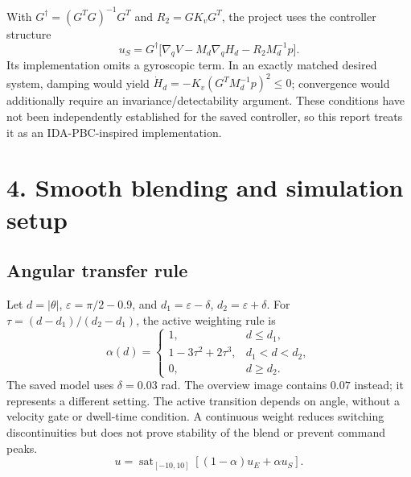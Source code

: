 \documentclass[11pt,a4paper]{article}
\newcommand{\reportsection}[1]{\section*{\color{navy}#1}}
\newcommand{\topic}[1]{\subsection*{\color{teal}#1}}
\begin{document}
With $G^\dagger=(G^TG)^{-1}G^T$ and $R_2=GK_vG^T$, the project uses the controller structure
\begin{equation}
 u_S=G^\dagger\big[\nabla_q V-M_d\nabla_q H_d-R_2M_d^{-1}p\big].
\end{equation}
Its implementation omits a gyroscopic term. In an exactly matched desired system, damping would yield $\dot H_d=-K_v(G^TM_d^{-1}p)^2\leq0$; convergence would additionally require an invariance/detectability argument. These conditions have not been independently established for the saved controller, so this report treats it as an IDA-PBC-inspired implementation.

\clearpage
\reportsection{4. Smooth blending and simulation setup}
\topic{Angular transfer rule}
Let $d=\lvert\theta\rvert$, $\varepsilon=\pi/2-0.9$, and $d_1=\varepsilon-\delta$, $d_2=\varepsilon+\delta$. For $\tau=(d-d_1)/(d_2-d_1)$, the active weighting rule is
\begin{equation}
 \alpha(d)=\begin{cases}
 1,&d\leq d_1,\\
 1-3\tau^2+2\tau^3,&d_1<d<d_2,\\
 0,&d\geq d_2.
 \end{cases}
\end{equation}
The saved model uses $\delta=0.03$ rad. The overview image contains $0.07$ instead; it represents a different setting. The active transition depends on angle, without a velocity gate or dwell-time condition. A continuous weight reduces switching discontinuities but does not prove stability of the blend or prevent command peaks.
\begin{equation}
 u=\operatorname{sat}_{[-10,10]}\!\left[(1-\alpha)u_E+\alpha u_S\right].
\end{equation}

\begin{center}
\end{center}
\end{document}
